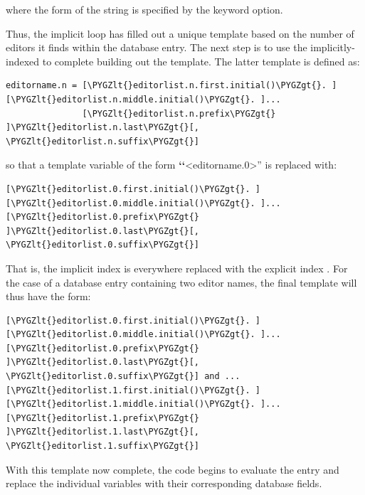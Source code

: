 \documentclass[letterpaper,10pt,english]{sphinxmanual}
\def\PYGZlt{\char`\<}
\def\PYGZgt{\char`\>}
\begin{document}
where the form of the string  is specified by the  keyword option.

Thus, the implicit loop has filled out a unique template based on the number of editors it finds within the database entry. The next step is to use the implicitly-indexed  to complete building out the template. The latter template is defined as:

\begin{Verbatim}[commandchars=\\\{\}]
editorname.n = [\PYGZlt{}editorlist.n.first.initial()\PYGZgt{}. ][\PYGZlt{}editorlist.n.middle.initial()\PYGZgt{}. ]...
               [\PYGZlt{}editorlist.n.prefix\PYGZgt{} ]\PYGZlt{}editorlist.n.last\PYGZgt{}[, \PYGZlt{}editorlist.n.suffix\PYGZgt{}]
\end{Verbatim}

so that a template variable of the form {\color{red}\bfseries{}{}`{}`}\textless{}editorname.0\textgreater{}'' is replaced with:

\begin{Verbatim}[commandchars=\\\{\}]
[\PYGZlt{}editorlist.0.first.initial()\PYGZgt{}. ][\PYGZlt{}editorlist.0.middle.initial()\PYGZgt{}. ]...
[\PYGZlt{}editorlist.0.prefix\PYGZgt{} ]\PYGZlt{}editorlist.0.last\PYGZgt{}[, \PYGZlt{}editorlist.0.suffix\PYGZgt{}]
\end{Verbatim}

That is, the implicit index  is everywhere replaced with the explicit index . For the case of a database entry containing two editor names, the final template will thus have the form:

\begin{Verbatim}[commandchars=\\\{\}]
[\PYGZlt{}editorlist.0.first.initial()\PYGZgt{}. ][\PYGZlt{}editorlist.0.middle.initial()\PYGZgt{}. ]...
[\PYGZlt{}editorlist.0.prefix\PYGZgt{} ]\PYGZlt{}editorlist.0.last\PYGZgt{}[, \PYGZlt{}editorlist.0.suffix\PYGZgt{}] and ...
[\PYGZlt{}editorlist.1.first.initial()\PYGZgt{}. ][\PYGZlt{}editorlist.1.middle.initial()\PYGZgt{}. ]...
[\PYGZlt{}editorlist.1.prefix\PYGZgt{} ]\PYGZlt{}editorlist.1.last\PYGZgt{}[, \PYGZlt{}editorlist.1.suffix\PYGZgt{}]
\end{Verbatim}

With this template now complete, the code begins to evaluate the entry and replace the individual variables with their corresponding database fields.
\end{document}

